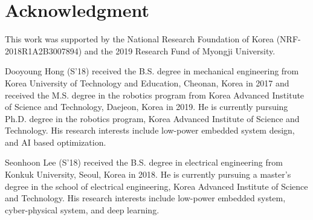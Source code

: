 \documentclass[journal]{./template/IEEEtran}
\begin{document}
\section*{Acknowledgment}
This work was supported by the National Research Foundation of Korea (NRF-2018R1A2B3007894) and the 2019 Research Fund of Myongji University. 



\begin{IEEEbiography}{Dooyoung Hong}
(S'18) received the B.S. degree in mechanical engineering from Korea University of Technology and Education, Cheonan, Korea in 2017 and received the M.S. degree in the robotics program from Korea Advanced Institute of Science and Technology, Daejeon, Korea in 2019. He is currently pursuing Ph.D. degree in the robotics program, Korea Advanced Institute of Science and Technology. His research interests include low-power embedded system design, and AI based optimization.
\end{IEEEbiography}

\begin{IEEEbiography}{Seonhoon Lee}
(S'18) received the B.S. degree in electrical engineering from Konkuk University, Seoul, Korea in 2018. He is currently pursuing a master’s degree in the school of electrical engineering, Korea Advanced Institute of Science and Technology. His research interests include low-power embedded system, cyber-physical system, and deep learning.
\end{IEEEbiography}
\end{document}
